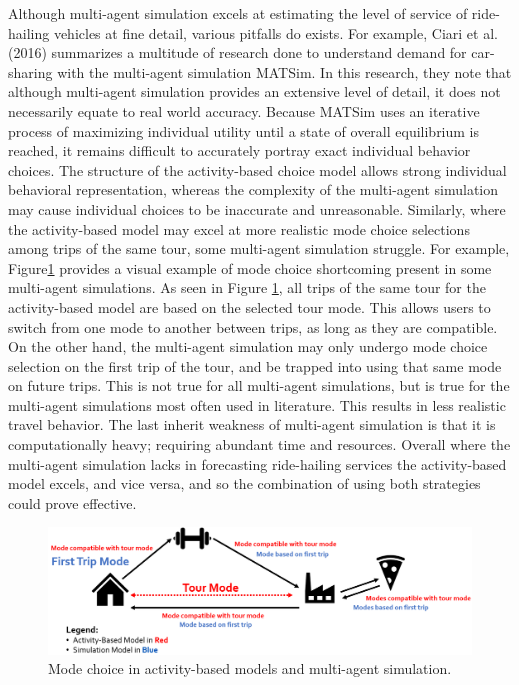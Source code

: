 \documentclass[fancy, masters]{byuthesis}
\begin{document}
Although multi-agent simulation excels at estimating the level of service of ride-hailing vehicles at fine detail, various pitfalls do exists. For example, Ciari et al. (2016) summarizes a multitude of research done to understand demand for car-sharing with the multi-agent simulation MATSim. In this research, they note that although multi-agent simulation provides an extensive level of detail, it does not necessarily equate to real world accuracy. Because MATSim uses an iterative process of maximizing individual utility until a state of overall equilibrium is reached, it remains difficult to accurately portray exact individual behavior choices. The structure of the activity-based choice model allows strong individual behavioral representation, whereas the complexity of the multi-agent simulation may cause individual choices to be inaccurate and unreasonable. Similarly, where the activity-based model may excel at more realistic mode choice selections among trips of the same tour, some multi-agent simulation struggle. For example, Figure\ref{fig:fig-mode-compare} provides a visual example of mode choice shortcoming present in some multi-agent simulations. As seen in Figure \ref{fig:fig-mode-compare}, all trips of the same tour for the activity-based model are based on the selected tour mode. This allows users to switch from one mode to another between trips, as long as they are compatible. On the other hand, the multi-agent simulation may only undergo mode choice selection on the first trip of the tour, and be trapped into using that same mode on future trips. This is not true for all multi-agent simulations, but is true for the multi-agent simulations most often used in literature. This results in less realistic travel behavior. The last inherit weakness of multi-agent simulation is that it is computationally heavy; requiring abundant time and resources. Overall where the multi-agent simulation lacks in forecasting ride-hailing services the activity-based model excels, and vice versa, and so the combination of using both strategies could prove effective.

\begin{figure}

{\centering \includegraphics[width=1\linewidth]{pics/abm-mas-compare} 

}

\caption{Mode choice in activity-based models and multi-agent simulation.}\label{fig:fig-mode-compare}
\end{figure}
\end{document}
